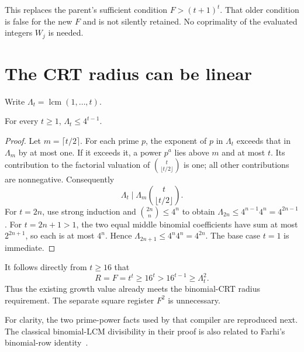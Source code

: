 This replaces the parent's sufficient condition $F>(t+1)^t$. That older
condition is false for the new $F$ and is not silently retained. No
coprimality of the evaluated integers $W_j$ is needed.

\section{The CRT radius can be linear}\label{sec:radius}

Write $\Lambda_t=\operatorname{lcm}(1,\ldots,t)$.

\begin{lemma}\label{lem:lcm}
For every $t\ge1$, $\Lambda_t\le4^{t-1}$.
\end{lemma}
\begin{proof}
Let $m=\lceil t/2\rceil$. For each prime $p$, the exponent of $p$ in
$\Lambda_t$ exceeds that in $\Lambda_m$ by at most one. If it exceeds
it, a power $p^a$ lies above $m$ and at most $t$. Its contribution to
the factorial valuation of $\binom{t}{\lfloor t/2\rfloor}$ is one;
all other contributions are nonnegative. Consequently
\[
 \Lambda_t\mid\Lambda_m\binom{t}{\lfloor t/2\rfloor}.
\]
For $t=2n$, use strong induction and $\binom{2n}{n}\le4^n$ to obtain
$\Lambda_{2n}\le4^{n-1}4^n=4^{2n-1}$.
For $t=2n+1>1$, the two equal middle binomial coefficients have sum at
most $2^{2n+1}$, so each is at most $4^n$. Hence
$\Lambda_{2n+1}\le4^n4^n=4^{2n}$. The base case $t=1$ is immediate.
\end{proof}

It follows directly from $t\ge16$ that
\begin{equation}\label{eq:radius}
 R=F=t^t\ge16^t>16^{t-1}\ge\Lambda_t^2.
\end{equation}
Thus the existing growth value already meets the binomial-CRT radius
requirement. The separate square register $F^2$ is unnecessary.

For clarity, the two prime-power facts used by that compiler are reproduced
next. The classical binomial-LCM divisibility in their proof is also
related to Farhi's binomial-row identity~\cite{farhi}.


